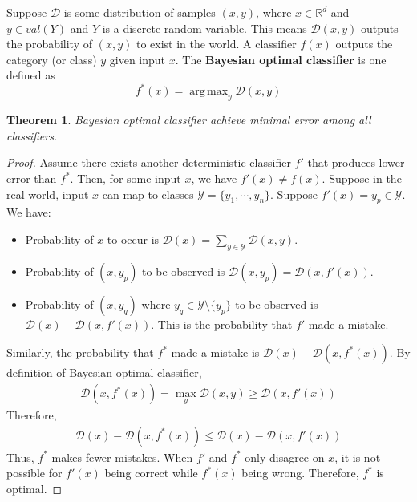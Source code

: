 \documentclass[12pt]{article}
\newtheorem{theorem}{Theorem}[section]
\theoremstyle{definition}
\DeclareMathOperator*{\argmax}{arg\,max}
\begin{document}
Suppose $\mathcal{D}$ is some distribution of samples $(x,y)$, where $x\in\mathbb{R}^d$ and $y\in val(Y)$ and $Y$ is a discrete random variable. This means $\mathcal{D}(x,y)$ outputs the probability of $(x,y)$ to exist in the world. A classifier $f(x)$ outputs the category (or class) $y$ given input $x$. The \textbf{Bayesian optimal classifier} is one defined as
\begin{equation}
  f^*(x)=\argmax_y\mathcal{D}(x,y)
\end{equation}
\begin{theorem}
  Bayesian optimal classifier achieve minimal error among all classifiers.
\end{theorem}
\begin{proof}
  Assume there exists another deterministic classifier $f'$ that produces lower error than $f^*$. Then, for some input $x$, we have $f'(x)\neq f(x)$. Suppose in the real world, input $x$ can map to classes $\mathcal{Y}=\{y_1,\cdots,y_n\}$. Suppose $f'(x)=y_p\in\mathcal{Y}$. We have:
  \begin{itemize}
  \item Probability of $x$ to occur is $\mathcal{D}(x)=\sum_{y\in\mathcal{Y}}\mathcal{D}(x,y)$.
  \item Probability of $(x,y_p)$ to be observed is $\mathcal{D}(x,y_p)=\mathcal{D}(x,f'(x))$.
  \item Probability of $(x,y_q)$ where $y_q\in\mathcal{Y}\setminus\{y_p\}$ to be observed is $\mathcal{D}(x)-\mathcal{D}(x,f'(x))$. This is the probability that $f'$ made a mistake.
  \end{itemize}
  Similarly, the probability that $f^*$ made a mistake is $\mathcal{D}(x)-\mathcal{D}(x,f^*(x))$. By definition of Bayesian optimal classifier,
  \begin{align}
    \mathcal{D}(x,f^*(x))=\max_y\mathcal{D}(x,y)\geq\mathcal{D}(x,f'(x))
  \end{align}
  Therefore,
  \begin{align}
    \mathcal{D}(x)-\mathcal{D}(x,f^*(x))\leq\mathcal{D}(x)-\mathcal{D}(x,f'(x))
  \end{align}
  Thus, $f^*$ makes fewer mistakes. When $f'$ and $f^*$ only disagree on $x$, it is not possible for $f'(x)$ being correct while $f^*(x)$ being wrong. Therefore, $f^*$ is optimal.
\end{proof}

\end{document}
